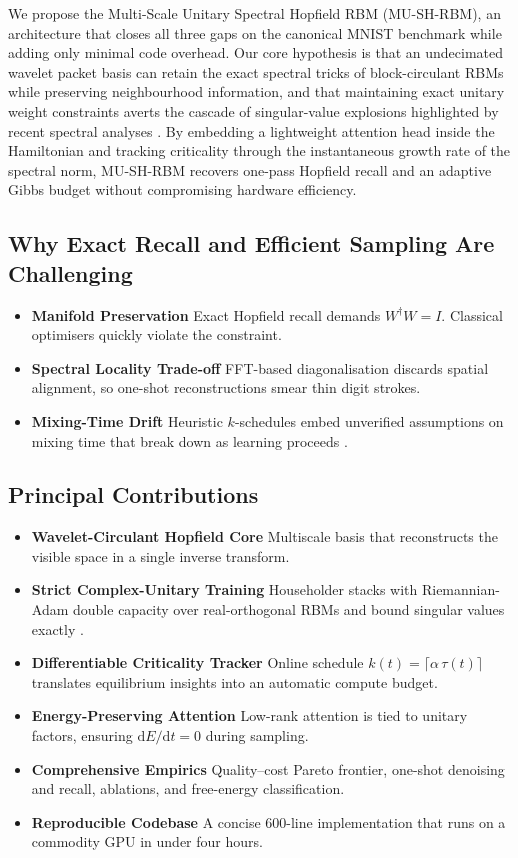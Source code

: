 \documentclass{article} %
\begin{document}
We propose the Multi-Scale Unitary Spectral Hopfield RBM (MU-SH-RBM), an architecture that closes all three gaps on the canonical MNIST benchmark while adding only minimal code overhead. Our core hypothesis is that an undecimated wavelet packet basis can retain the exact spectral tricks of block-circulant RBMs while preserving neighbourhood information, and that maintaining exact unitary weight constraints averts the cascade of singular-value explosions highlighted by recent spectral analyses \citep{bachtis_2024_cascade}. By embedding a lightweight attention head inside the Hamiltonian and tracking criticality through the instantaneous growth rate of the spectral norm, MU-SH-RBM recovers one-pass Hopfield recall and an adaptive Gibbs budget without compromising hardware efficiency.

\subsection{Why Exact Recall and Efficient Sampling Are Challenging}
\begin{itemize}
    \item \textbf{Manifold Preservation} Exact Hopfield recall demands $W^{\dagger}W=I$. Classical optimisers quickly violate the constraint.
    \item \textbf{Spectral Locality Trade-off} FFT-based diagonalisation discards spatial alignment, so one-shot reconstructions smear thin digit strokes.
    \item \textbf{Mixing-Time Drift} Heuristic $k$-schedules embed unverified assumptions on mixing time that break down as learning proceeds \citep{decelle_2021_equilibrium}.
\end{itemize}

\subsection{Principal Contributions}
\begin{itemize}
    \item \textbf{Wavelet-Circulant Hopfield Core} Multiscale basis that reconstructs the visible space in a single inverse transform.
    \item \textbf{Strict Complex-Unitary Training} Householder stacks with Riemannian-Adam double capacity over real-orthogonal RBMs and bound singular values exactly \citep{bachtis_2024_cascade}.
    \item \textbf{Differentiable Criticality Tracker} Online schedule $k(t)=\lceil\alpha\,\tau(t)\rceil$ translates equilibrium insights into an automatic compute budget.
    \item \textbf{Energy-Preserving Attention} Low-rank attention is tied to unitary factors, ensuring $\mathrm dE/\mathrm dt = 0$ during sampling.
    \item \textbf{Comprehensive Empirics} Quality--cost Pareto frontier, one-shot denoising and recall, ablations, and free-energy classification.
    \item \textbf{Reproducible Codebase} A concise 600-line implementation that runs on a commodity GPU in under four hours.
\end{itemize}
\end{document}
